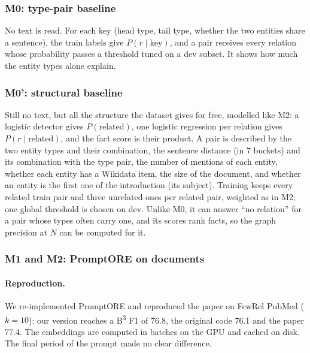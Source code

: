 \documentclass[pdflatex,sn-mathphys-num]{sn-jnl}
\begin{document}
\subsubsection{M0: type-pair baseline}
No text is read. For each key (head type, tail type, whether the two entities share a sentence), the train labels give $P(r \mid \text{key})$, and a pair receives every relation whose probability passes a threshold tuned on a dev subset. It shows how much the entity types alone explain.

\subsubsection{M0': structural baseline}
Still no text, but all the structure the dataset gives for free, modelled like M2: a logistic detector gives $P(\text{related})$, one logistic regression per relation gives $P(r \mid \text{related})$, and the fact score is their product. A pair is described by the two entity types and their combination, the sentence distance (in 7 buckets) and its combination with the type pair, the number of mentions of each entity, whether each entity has a Wikidata item, the size of the document, and whether an entity is the first one of the introduction (its subject). Training keeps every related train pair and three unrelated ones per related pair, weighted as in M2; one global threshold is chosen on dev. Unlike M0, it can answer ``no relation'' for a pair whose types often carry one, and its scores rank facts, so the graph precision at $N$ can be computed for it.

\subsubsection{M1 and M2: PromptORE on documents}\label{sec:promptore}

\paragraph{Reproduction.} We re-implemented PromptORE and reproduced the paper on FewRel PubMed ($k=10$): our version reaches a B\textsuperscript{3} F1 of 76.8, the original code 76.1 and the paper 77.4. The embeddings are computed in batches on the GPU and cached on disk. The final period of the prompt made no clear difference.
\end{document}
